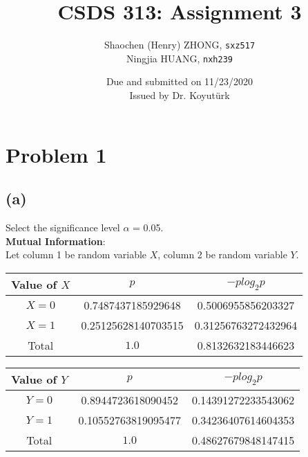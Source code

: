 \documentclass[12pt]{article}
\newcommand{\ilc}{\texttt}
\begin{document}
\title{\textbf{CSDS 313: Assignment 3}}

\author{Shaochen (Henry) ZHONG, \ilc{sxz517} \\Ningjia HUANG, \ilc{nxh239}}
\date{Due and submitted on 11/23/2020 \\ Issued by Dr. Koyut{\"u}rk}
\maketitle

\section*{Problem 1}


\subsection*{(a)}
Select the significance level $\alpha$ = 0.05. \\

\noindent\textbf{Mutual Information}: \\
Let column 1 be random variable $X$, column 2 be random variable $Y$.
\begin{center}
    \begin{tabular}{ | c | c | c | }
        \hline
        Value of $X$ & $p$ & $-plog_{2}p$ \\
        \hline
        $X = 0$ & 0.7487437185929648 & 0.5006955856203327 \\
        \hline
        $X = 1$ & 0.25125628140703515 & 0.31256763272432964 \\
        \hline
        Total & $1.0$ & 0.8132632183446623 \\
        \hline
        \end{tabular}
\end{center}

\begin{center}
  \begin{tabular}{ | c | c | c | }
      \hline
      Value of $Y$ & $p$ & $-plog_{2}p$ \\
      \hline
      $Y = 0$ & 0.8944723618090452 & 0.14391272233543062 \\
      \hline
      $Y = 1$ & 0.10552763819095477 & 0.34236407614604353 \\
      \hline
      Total & $1.0$ & 0.48627679848147415 \\
      \hline
      \end{tabular}
\end{center}
\end{document}
